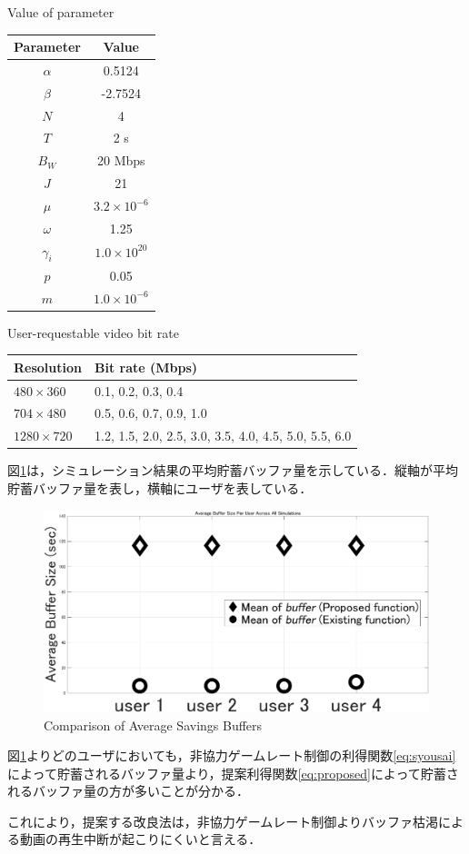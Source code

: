 \begin{table}[h!]
\centering
{}
            {Value of parameter\cite{kison}}
\label{tab:parameters}
\begin{tabular}{cc}
\toprule
\textbf{Parameter} & \textbf{Value} \\
\midrule
$\alpha$ & 0.5124 \\
$\beta$ & -2.7524 \\
$N$ & 4 \\
$T$ & 2 s \\
$B_W$ & 20 Mbps \\
$J$ & 21 \\
$\mu$ & $3.2 \times 10^{-6}$ \\
$\omega$ & 1.25 \\
$\gamma_i$ & $1.0 \times 10^{20}$ \\
$p$ & 0.05 \\
$m$ & $1.0 \times 10^{-6}$ \\
\bottomrule
\end{tabular}
\end{table}

\begin{table}[h!]
\centering
{}
            {User-requestable video bit rate\cite{kison}}
\label{tab:bitrates}
\begin{tabular}{ll}
\toprule
\textbf{Resolution} & \textbf{Bit rate (Mbps)} \\
\midrule
$480 \times 360$ & 0.1, 0.2, 0.3, 0.4 \\
$704 \times 480$ & 0.5, 0.6, 0.7, 0.9, 1.0 \\
$1280 \times 720$ & 1.2, 1.5, 2.0, 2.5, 3.0, 3.5, 4.0, 4.5, 5.0, 5.5, 6.0 \\
\bottomrule
\end{tabular}
\end{table}

図\ref{fig:hiritu}は，シミュレーション結果の平均貯蓄バッファ量を示している．縦軸が平均貯蓄バッファ量を表し，横軸にユーザを表している．


\begin{figure}[h]
  \centering
  \includegraphics[scale=0.45]{hiritu_buffer.eps}
            {Comparison of Average Savings Buffers}
    \label{fig:hiritu}
\end{figure}

図\ref{fig:hiritu}よりどのユーザにおいても，非協力ゲームレート制御\cite{kison}の利得関数\ref{eq:syousai}によって貯蓄されるバッファ量より，提案利得関数\ref{eq:proposed}によって貯蓄されるバッファ量の方が多いことが分かる．

これにより，提案する改良法は，非協力ゲームレート制御\cite{kison}よりバッファ枯渇による動画の再生中断が起こりにくいと言える．